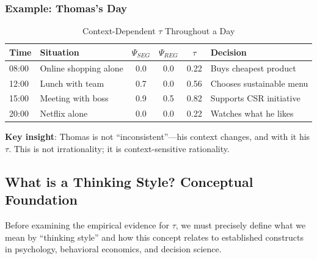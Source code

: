 \subsubsection{Example: Thomas's Day}

\begin{table}[htbp]
\centering
\caption{Context-Dependent $\tau$ Throughout a Day}
\label{tab:thomas-day}
\begin{tabular}{@{}llcccl@{}}
\toprule
\textbf{Time} & \textbf{Situation} & $\Psi_{SEG}$ & $\Psi_{REG}$ & $\tau$ & \textbf{Decision} \\
\midrule
08:00 & Online shopping alone & 0.0 & 0.0 & 0.22 & Buys cheapest product \\
12:00 & Lunch with team & 0.7 & 0.0 & 0.56 & Chooses sustainable menu \\
15:00 & Meeting with boss & 0.9 & 0.5 & 0.82 & Supports CSR initiative \\
20:00 & Netflix alone & 0.0 & 0.0 & 0.22 & Watches what he likes \\
\bottomrule
\end{tabular}
\end{table}

\textbf{Key insight}: Thomas is not ``inconsistent''---his context changes, and with it his $\tau$. This is not irrationality; it is context-sensitive rationality.





\subsection{What is a Thinking Style? Conceptual Foundation}
\label{sec:thinking-style-concept}

Before examining the empirical evidence for $\tau$, we must precisely define what we mean by ``thinking style'' and how this concept relates to established constructs in psychology, behavioral economics, and decision science.

